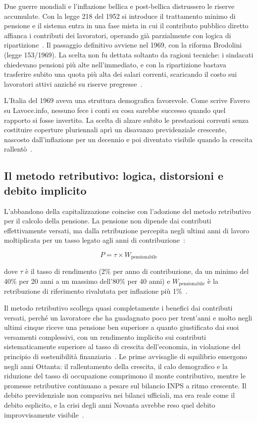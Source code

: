 Due guerre mondiali e l'inflazione bellica e post-bellica distrussero le riserve accumulate. Con la legge 218 del 1952 si introduce il trattamento minimo di pensione e il sistema entra in una fase mista in cui il contributo pubblico diretto affianca i contributi dei lavoratori, operando già parzialmente con logica di ripartizione~\cite{CERP2008, Bosi2018}. Il passaggio definitivo avviene nel 1969, con la riforma Brodolini (legge 153/1969). La scelta non fu dettata soltanto da ragioni tecniche: i sindacati chiedevano pensioni più alte nell'immediato, e con la ripartizione bastava trasferire subito una quota più alta dei salari correnti, scaricando il costo sui lavoratori attivi anziché su riserve pregresse~\cite{Fondapol}.

L'Italia del 1969 aveva una struttura demografica favorevole. Come scrive Favero su Lavoce.info, nessuno fece i conti su cosa sarebbe successo quando quel rapporto si fosse invertito. La scelta di alzare subito le prestazioni correnti senza costituire coperture pluriennali aprì un disavanzo previdenziale crescente, nascosto dall'inflazione per un decennio e poi diventato visibile quando la crescita rallentò~\cite{LavoceRiformaDini}.

\subsection{Il metodo retributivo: logica, distorsioni e debito implicito}

L'abbandono della capitalizzazione coincise con l'adozione del metodo retributivo per il calcolo della pensione. La pensione non dipende dai contributi effettivamente versati, ma dalla retribuzione percepita negli ultimi anni di lavoro moltiplicata per un tasso legato agli anni di contribuzione~\cite{Bosi2018}:

\[
P = \tau \times W_{\text{pensionabile}}
\]

dove \(\tau\) è il tasso di rendimento (2\% per anno di contribuzione, da un minimo del 40\% per 20 anni a un massimo dell'80\% per 40 anni) e \(W_{\text{pensionabile}}\) è la retribuzione di riferimento rivalutata per inflazione più 1\%~\cite{RosenGayerRapallini2023}.

Il metodo retributivo scollega quasi completamente i benefici dai contributi versati, perché un lavoratore che ha guadagnato poco per trent'anni e molto negli ultimi cinque riceve una pensione ben superiore a quanto giustificato dai suoi versamenti complessivi, con un rendimento implicito sui contributi sistematicamente superiore al tasso di crescita dell'economia, in violazione del principio di sostenibilità finanziaria~\cite{LavoceRiformaDini}. Le prime avvisaglie di squilibrio emergono negli anni Ottanta: il rallentamento della crescita, il calo demografico e la riduzione del tasso di occupazione comprimono il monte contributivo, mentre le promesse retributive continuano a pesare sul bilancio INPS a ritmo crescente. Il debito previdenziale non compariva nei bilanci ufficiali, ma era reale come il debito esplicito, e la crisi degli anni Novanta avrebbe reso quel debito improvvisamente visibile~\cite{LavoceRiformaDini, Bosi2018}.

